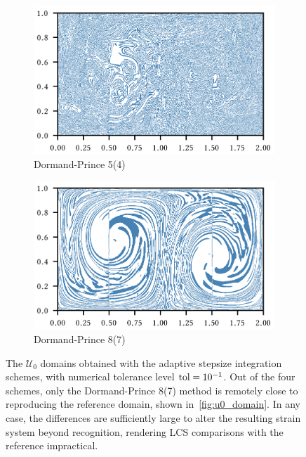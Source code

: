 \begin{figure}[htpb]
    \begin{subfigure}[b]{0.475\textwidth}
        \centering
        \includegraphics{figures/domain_figures/rkdp54_err_half_width.png}
        \caption[]{{\small Dormand-Prince 5(4)}}
        \label{fig:u0_dom_err_dp54}
    \end{subfigure}
    \begin{subfigure}[b]{0.475\textwidth}
        \centering
        \includegraphics{figures/domain_figures/rkdp87_err_half_width.png}
        \caption[]{{\small Dormand-Prince 8(7)}}
        \label{fig:u0_dom_err_dp87}
    \end{subfigure}
    \caption[The $\mathcal{U}_{0}$ domains obtained with the adaptive stepsize
    integration schemes, with numerical tolerance level
    $\textnormal{tol}=10^{-1}$]{
        The $\mathcal{U}_{0}$ domains obtained with the adaptive stepsize
        integration schemes, with numerical tolerance level
        $\textnormal{tol}=10^{-1}$. Out of the four schemes, only the
    Dormand-Prince 8(7) method is remotely close to reproducing the
    reference domain, shown in~\ref{fig:u0_domain}. In any case, the
    differences are sufficiently large to alter the resulting strain
    system beyond recognition, rendering LCS comparisons with the reference
    impractical.}
    \label{fig:u0_dom_errs}
\end{figure}

